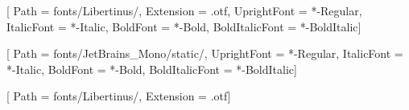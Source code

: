 

\setmainfont{LibertinusSerif}[
    Path            = fonts/Libertinus/,
    Extension       = .otf,
    UprightFont     = *-Regular,
    ItalicFont      = *-Italic,
    BoldFont        = *-Bold,
    BoldItalicFont  = *-BoldItalic]

\setmonofont{JetBrainsMono}[
    Path            = fonts/JetBrains_Mono/static/,
    UprightFont     = *-Regular,
    ItalicFont      = *-Italic,
    BoldFont        = *-Bold,
    BoldItalicFont  = *-BoldItalic]

[
    Path            = fonts/Libertinus/,
    Extension       = .otf]

\pgfplotsset{compat=1.18, grid=both, axis lines=middle}
\lstset{basicstyle=\ttfamily,columns=fullflexible,breaklines=true,frame=shadowbox,keepspaces}

\newcommand{\nth}{^{\text{th}}}

\renewcommand{\qedsymbol}{$\blacksquare$}
\renewcommand{\implies}{\rightarrow}

\usetikzlibrary{arrows,automata,shapes}




